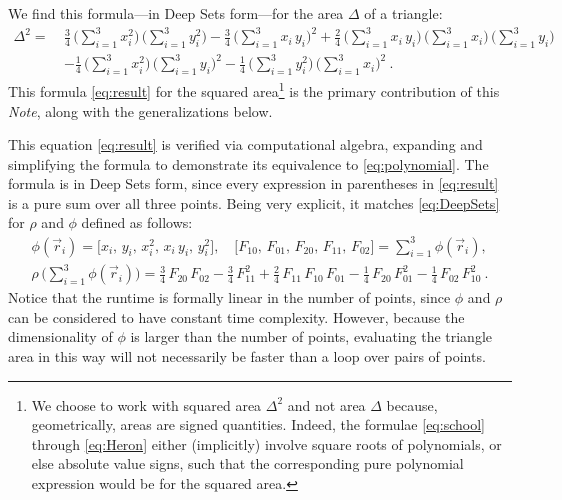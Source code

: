 \documentclass[10pt]{article}
\newcommand{\documentname}{\textsl{Note}}
\newcommand{\secbreak}{\bigskip{\centering\footnotesize%
\rotatebox[origin=c]{55}{$\triangle$}~~~%
\rotatebox[origin=c]{35}{$\triangle$}~~~%
\rotatebox[origin=c]{15}{$\triangle$}\par}\bigskip\noindent}
\begin{document}
\secbreak
We find this formula---in Deep Sets form---for the area $\Delta$ of a triangle:
\begin{align}
    \Delta^2 = \ &
    \frac{3}{4}
        \,\big( \sum_{i=1}^{3} x_i^2 \big)
        \,\big( \sum_{i=1}^{3} y_i^2 \big)
    - \frac{3}{4}
        \,\big( \sum_{i=1}^{3} x_i \, y_i \big)^2 
    + \frac{2}{4}
        \,\big( \sum_{i=1}^{3} x_i \, y_i \big)
        \,\big( \sum_{i=1}^{3} x_i \big)
        \,\big( \sum_{i=1}^{3} y_i \big)
    \nonumber\\ &
    - \frac{1}{4}
        \,\big( \sum_{i=1}^{3} x_i^2 \big)
        \,\big( \sum_{i=1}^{3} y_i \big)^2
    - \frac{1}{4}
        \,\big( \sum_{i=1}^{3} y_i^2 \big)
        \,\big( \sum_{i=1}^{3} x_i \big)^2
     ~.
\label{eq:result}
\end{align}
This formula \eqref{eq:result} for the squared area\footnote{%
    We choose to work with squared area $\Delta^2$ and not area $\Delta$ because, geometrically, areas are signed quantities.
    Indeed, the formulae \eqref{eq:school} through \eqref{eq:Heron} either (implicitly) involve square roots of polynomials, or else absolute value signs, such that the corresponding pure polynomial expression would be for the squared area.}
is the primary contribution of this \documentname, along with the generalizations below.

This equation \eqref{eq:result} is verified via computational algebra, expanding and simplifying the formula to demonstrate its equivalence to \eqref{eq:polynomial}.
The formula is in Deep Sets form, since
every expression in parentheses in \eqref{eq:result} is a pure sum over all three points.
Being very explicit, it matches \eqref{eq:DeepSets} for $\rho$ and $\phi$ defined as follows:
\begin{gather}
    \label{eq:resultDeepSets}
    \phi(\vec{r}_i) = \big[
        x_i, \,
        y_i, \,
        x_i^2, \,
        x_i \, y_i, \,
        y_i^2
    \big], \quad
    \big[
        F_{10}, \,
        F_{01}, \,
        F_{20}, \,
        F_{11}, \,
        F_{02}
    \big] = \sum_{i=1}^{3} \phi(\vec{r}_i),
    \\
    \rho \, \big( \sum_{i=1}^{3} \phi(\vec{r}_i) \big)
    = \frac{3}{4} \, F_{20} \, F_{02}
    - \frac{3}{4} \, F_{11}^2
    + \frac{2}{4} \, F_{11} \, F_{10} \, F_{01}
    - \frac{1}{4} \, F_{20} \, F_{01}^2
    - \frac{1}{4} \, F_{02} \, F_{10}^2~.
    \nonumber
\end{gather}
Notice that the runtime is formally linear in the number of points, since $\phi$ and $\rho$ can be considered to have constant time complexity.
However, because the dimensionality of $\phi$ is larger than the number of points, evaluating the triangle area in this way will not necessarily be faster than a loop over pairs of points.
\end{document}
